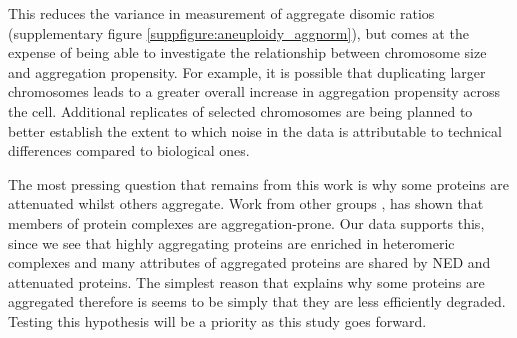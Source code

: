 \documentclass[a4paper,11pt,twoside,openright]{scrbook}
\begin{document}
This reduces the variance in measurement of aggregate disomic ratios
(supplementary figure \ref{suppfigure:aneuploidy_aggnorm}), but comes at the
expense of being able to investigate the relationship between chromosome size
and aggregation propensity. For example, it is possible that duplicating larger
chromosomes leads to a greater overall increase in aggregation propensity across
the cell. Additional replicates of selected chromosomes are being planned to
better establish the extent to which noise in the data is attributable to
technical differences compared to biological ones.

The most pressing question that remains from this work is why some proteins are
attenuated whilst others aggregate. Work from other groups \cite{Pechmann2009,
Yang2012}, has shown that members of protein complexes are aggregation-prone.
Our data supports this, since we see that highly aggregating proteins are
enriched in heteromeric complexes and many attributes of aggregated proteins are
shared by NED and attenuated proteins. The simplest reason that explains why
some proteins are aggregated therefore is seems to be simply that they are less
efficiently degraded. Testing this hypothesis will be a priority as this study
goes forward.
\end{document}
